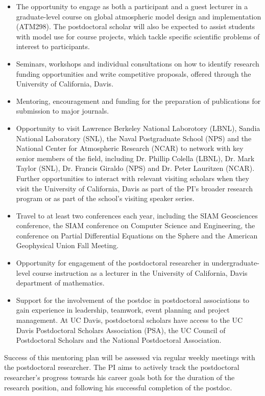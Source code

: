 \documentclass[11pt]{article}
\begin{document}
\begin{itemize}
\item The opportunity to engage as both a participant and a guest lecturer in a graduate-level course on global atmospheric model design and implementation (ATM298).  The postdoctoral scholar will also be expected to assist students with model use for course projects, which tackle specific scientific problems of interest to participants.
\item Seminars, workshops and individual consultations on how to identify research funding opportunities and write competitive proposals, offered through the University of California, Davis.
\item Mentoring, encouragement and funding for the preparation of publications for submission to major journals.
\item Opportunity to visit Lawrence Berkeley National Laborotory (LBNL), Sandia National Laboratory (SNL), the Naval Postgraduate School (NPS) and the National Center for Atmospheric Research (NCAR) to network with key senior members of the field, including Dr. Phillip Colella (LBNL), Dr. Mark Taylor (SNL), Dr. Francis Giraldo (NPS) and Dr. Peter Lauritzen (NCAR).  Further opportunities to interact with relevant visiting scholars when they visit the University of California, Davis as part of the PI's broader research program or as part of the school's visiting speaker series.
\item Travel to at least two conferences each year, including the SIAM Geosciences conference, the SIAM conference on Computer Science and Engineering, the conference on Partial Differential Equations on the Sphere and the American Geophysical Union Fall Meeting.
\item Opportunity for engagement of the postdoctoral researcher in undergraduate-level course instruction as a lecturer in the University of California, Davis department of mathematics.
\item Support for the involvement of the postdoc in postdoctoral associations to gain experience in leadership, teamwork, event planning and project management.  At UC Davis, postdoctoral scholars have access to the UC Davis Postdoctoral Scholars Association (PSA), the UC Council of Postdoctoral Scholars and the National Postdoctoral Association.
\end{itemize}

Success of this mentoring plan will be assessed via regular weekly meetings with the postdoctoral researcher.  The PI aims to actively track the postdoctoral researcher's progress towards his career goals both for the duration of the research position, and following his successful completion of the postdoc.
\end{document}
